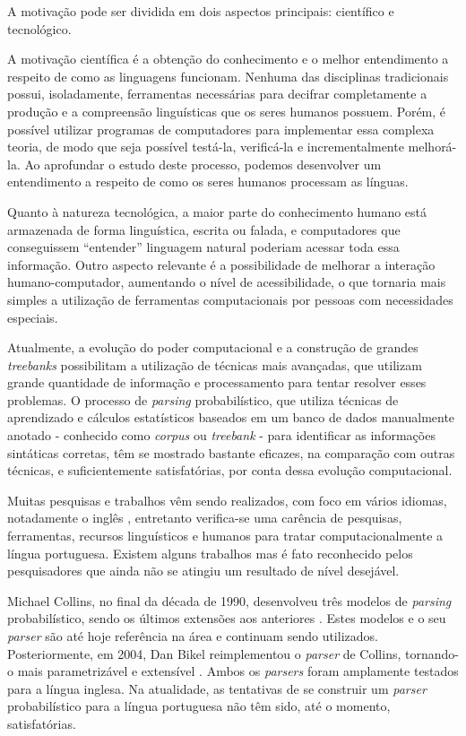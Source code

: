 A motivação pode ser dividida em dois aspectos principais: científico e tecnológico.

A motivação científica é a obtenção do conhecimento e o melhor entendimento a respeito de como as linguagens funcionam. Nenhuma das disciplinas tradicionais possui, isoladamente, ferramentas necessárias para decifrar completamente a produção e a compreensão linguísticas que os seres humanos possuem. Porém, é possível utilizar programas de computadores para implementar essa complexa teoria, de modo que seja possível testá-la, verificá-la e incrementalmente melhorá-la. Ao aprofundar o estudo deste processo, podemos desenvolver um entendimento a respeito de como os seres humanos processam as línguas.

Quanto à natureza tecnológica, a maior parte do conhecimento humano está armazenada de forma linguística, escrita ou falada, e computadores que conseguissem ``entender'' linguagem natural poderiam acessar toda essa informação. Outro aspecto relevante é a possibilidade de melhorar a interação humano-computador, aumentando o nível de acessibilidade, o que tornaria mais simples a utilização de ferramentas computacionais por pessoas com necessidades especiais.

Atualmente, a evolução do poder computacional e a construção de grandes \emph{treebanks} possibilitam a utilização de técnicas mais avançadas, que utilizam grande quantidade de informação e processamento para tentar resolver esses problemas. O processo de \emph{parsing} probabilístico, que utiliza técnicas de aprendizado e cálculos estatísticos baseados em um banco de dados manualmente anotado - conhecido como \emph{corpus} ou \emph{treebank} - para identificar as informações sintáticas corretas, têm se mostrado bastante eficazes, na comparação com outras técnicas, e suficientemente satisfatórias, por conta dessa evolução computacional.

Muitas pesquisas e trabalhos vêm sendo realizados, com foco em vários idiomas, notadamente o inglês \cite{prolo03,charniak97,collins97}, entretanto verifica-se uma carência de pesquisas, ferramentas, recursos linguísticos e humanos para tratar computacionalmente a língua portuguesa.
Existem alguns trabalhos \cite{baldridge06,bick00,bonfante03} mas é fato reconhecido pelos pesquisadores que ainda não se atingiu um resultado de nível desejável.

Michael Collins, no final da década de 1990, desenvolveu três modelos de \emph{parsing} probabilístico, sendo os últimos extensões aos anteriores \cite{collins97,collins99}. Estes modelos e o seu \emph{parser} são até hoje referência na área e continuam sendo utilizados. Posteriormente, em 2004, Dan Bikel reimplementou o \emph{parser} de Collins, tornando-o mais parametrizável e extensível \cite{bikel04}. Ambos os \emph{parsers} foram amplamente testados para a língua inglesa. Na atualidade, as tentativas de se construir um \emph{parser} probabilístico para a língua portuguesa não têm sido, até o momento, satisfatórias.



